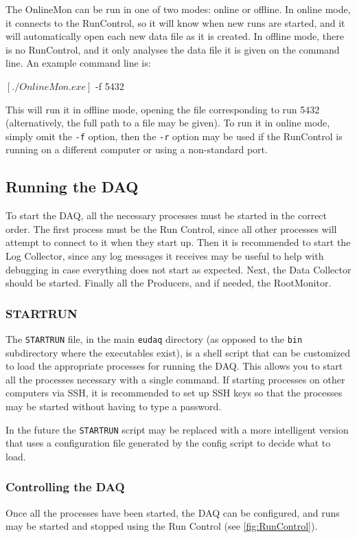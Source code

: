The OnlineMon can be run in one of two modes: online or offline.
In online mode, it connects to the RunControl, so it will know when new runs are started,
and it will automatically open each new data file as it is created.
In offline mode, there is no RunControl,
and it only analyses the data file it is given on the command line. 
An example command line is:
\begin{listing}[mybash]
$[./OnlineMon.exe]$ -f 5432
\end{listing}

This will run it in offline mode, opening the file corresponding to run 5432
(alternatively, the full path to a file may be given).
To run it in online mode, simply omit the \texttt{-f} option,
then the \texttt{-r} option may be used if the RunControl
is running on a different computer or using a non-standard port.

\subsection{Running the DAQ}
To start the DAQ, all the necessary processes must be started in the correct order.
The first process must be the Run Control,
since all other processes will attempt to connect to it when they start up.
Then it is recommended to start the Log Collector,
since any log messages it receives may be useful
to help with debugging in case everything does not start as expected.
Next, the Data Collector should be started.
Finally all the Producers, and if needed, the RootMonitor.

\subsubsection{STARTRUN}\label{sec:STARTRUN}
The \texttt{STARTRUN} file, in the main \texttt{eudaq} directory
(as opposed to the \texttt{bin} subdirectory where the executables exist),
is a shell script that can be customized to load the appropriate processes for running the DAQ.
This allows you to start all the processes necessary with a single command.
If starting processes on other computers via SSH,
it is recommended to set up SSH keys so that the processes may be started without having to type a password.

In the future the \texttt{STARTRUN} script may be replaced with a more intelligent version
that uses a configuration file generated by the config script to decide what to load.

\subsubsection{Controlling the DAQ}
Once all the processes have been started, the DAQ can be configured, and runs may be started and stopped
using the Run Control (see \autoref{fig:RunControl}).

